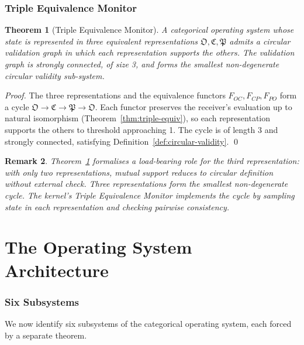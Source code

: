 \documentclass[twocolumn,a4paper]{article}
\newtheorem{theorem}{Theorem}[section]
\newtheorem{remark}[theorem]{Remark}
\newcommand{\OOsc}{\mathfrak{O}}
\newcommand{\CCat}{\mathfrak{C}}
\newcommand{\PPart}{\mathfrak{P}}
\begin{document}
\section{Triple Equivalence Monitor}
\label{sec:tem}

\begin{theorem}[Triple Equivalence Monitor]
\label{thm:tem}
A categorical operating system whose state is represented in three equivalent representations $\OOsc,\CCat,\PPart$ admits a circular validation graph in which each representation supports the others. The validation graph is strongly connected, of size 3, and forms the smallest non-degenerate circular validity sub-system.
\end{theorem}

\begin{proof}
The three representations and the equivalence functors $F_{OC},F_{CP},F_{PO}$ form a cycle $\OOsc\to\CCat\to\PPart\to\OOsc$. Each functor preserves the receiver's evaluation up to natural isomorphism (Theorem~\ref{thm:triple-equiv}), so each representation supports the others to threshold approaching 1. The cycle is of length 3 and strongly connected, satisfying Definition~\ref{def:circular-validity}. \qed
\end{proof}

\begin{remark}
Theorem~\ref{thm:tem} formalises a load-bearing role for the third representation: with only two representations, mutual support reduces to circular definition without external check. Three representations form the smallest non-degenerate cycle. The kernel's Triple Equivalence Monitor implements the cycle by sampling state in each representation and checking pairwise consistency.
\end{remark}

\part{The Operating System Architecture}

\section{Six Subsystems}
\label{sec:six-subsystems}

We now identify six subsystems of the categorical operating system, each forced by a separate theorem.
\end{document}

